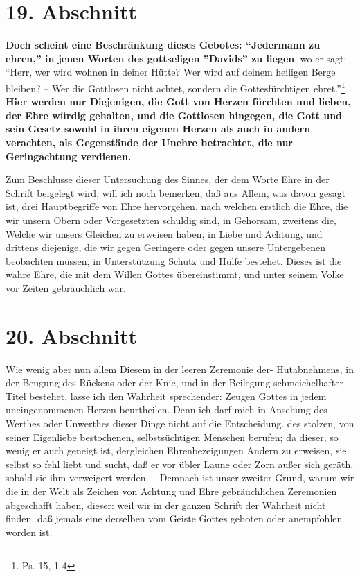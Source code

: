 \section{19. Abschnitt} \label{kap9_ab19}

\textbf{Doch scheint eine Beschränkung dieses Gebotes: "`Jedermann zu ehren,"' in jenen
Worten des gottseligen ''Davids'' zu liegen}, wo er sagt: "`Herr, wer wird wohnen
in deiner Hütte? Wer wird auf deinem heiligen Berge bleiben? -- Wer die
Gottlosen nicht achtet, sondern die Gottesfürchtigen ehret."'\footnote{Ps. 15,
1-4} \textbf{Hier werden nur Diejenigen, die Gott von Herzen fürchten und lieben, der
Ehre würdig gehalten, und die Gottlosen hingegen, die Gott und sein Gesetz
sowohl in ihren eigenen Herzen als auch in andern verachten, als Gegenstände der
Unehre betrachtet, die nur Geringachtung verdienen.}

Zum Beschlusse dieser Untersuchung des Sinnes, der dem Worte Ehre in der Schrift
beigelegt wird, will ich noch bemerken, daß aus Allem, was davon gesagt ist,
drei Hauptbegriffe von Ehre hervorgehen, nach welchen erstlich die Ehre, die wir
unsern Obern oder Vorgesetzten schuldig sind, in Gehorsam, zweitens die, Welche
wir unsers Gleichen zu erweisen haben, in Liebe und Achtung, und drittens
diejenige, die wir gegen Geringere oder gegen unsere Untergebenen beobachten
müssen, in Unterstützung Schutz und Hülfe bestehet. Dieses ist die wahre Ehre,
die mit dem Willen Gottes übereinstimmt, und unter seinem Volke vor Zeiten
gebräuchlich war.

\section{20. Abschnitt} \label{kap9_ab20}

Wie wenig aber nun allem Diesem in der leeren Zeremonie der- Hutabnehmens, in
der Beugung des Rückens oder der Knie, und in der Beilegung schmeichelhafter
Titel bestehet, lasse ich den Wahrheit sprechender: Zeugen Gottes in jedem
uneingenommenen Herzen beurtheilen. Denn ich darf mich in Ansehung des Werthes
oder Unwerthes dieser Dinge nicht auf die Entscheidung. des stolzen, von seiner
Eigenliebe bestochenen, selbstsüchtigen Menschen berufen; da dieser, so wenig er
auch geneigt ist, dergleichen Ehrenbezeigungen Andern zu erweisen, sie selbst so
fehl liebt und sucht, daß er vor übler Laune oder Zorn außer sich geräth, sobald
sie ihm verweigert werden. -- Demnach ist unser zweiter Grund, warum wir die in
der Welt als Zeichen von Achtung und Ehre gebräuchlichen Zeremonien abgeschafft
haben, dieser: weil wir in der ganzen Schrift der Wahrheit nicht finden, daß
jemals eine derselben vom Geiste Gottes geboten oder anempfohlen worden ist.

